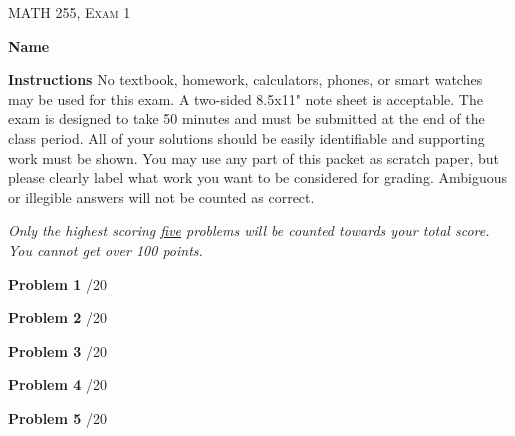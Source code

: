 \documentclass[12pt]{amsbook}
\begin{document}





\begin{center}
   \textsc{\large MATH 255, Exam 1}\\
\end{center}
\vspace{1cm}

\textbf{Name} \; \underline{\hspace{8cm}}

\vspace{1cm}

\textbf{Instructions} \; No textbook, homework, calculators, phones, or smart watches may be used for this exam. A two-sided 8.5x11" note sheet is acceptable.  The exam is designed to take 50 minutes and must be submitted at the end of the class period. All of your solutions should be easily identifiable and supporting work must be shown. You may use any part of this packet as scratch paper, but please clearly label what work you want to be considered for grading. Ambiguous or illegible answers will not be counted as correct.

\emph{Only the highest scoring \underline{five} problems will be counted towards your total score. You cannot get over 100 points.}

\vspace{1cm}

\textbf{Problem 1} \; \underline{\hspace{1cm}}/20

\vspace{.25cm}

\textbf{Problem 2} \; \underline{\hspace{1cm}}/20

\vspace{.25cm}

\textbf{Problem 3} \; \underline{\hspace{1cm}}/20

\vspace{.25cm}

\textbf{Problem 4} \; \underline{\hspace{1cm}}/20

\vspace{.25cm}

\textbf{Problem 5} \; \underline{\hspace{1cm}}/20

\vspace{.25cm}
\end{document}
